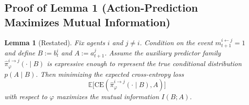 \documentclass{article}
\theoremstyle{plain}
\newtheorem{lemma}[theorem]{Lemma}
\theoremstyle{definition}
\theoremstyle{remark}
\begin{document}
\subsection{Proof of Lemma 1 (Action-Prediction Maximizes Mutual Information)}
\label{app:proof_lemma1}

\begin{lemma}[Restated]
\label{lem:mi_bound}
Fix agents $i$ and $j \neq i$. Condition on the event $m_{t+1}^{i \leftarrow j} = 1$ and define
$B := b_t^i$ and $A := a_{t+1}^j$.
Assume the auxiliary predictor family $\hat{\pi}^{i\rightarrow j}_\varphi(\cdot \mid B)$ is expressive enough to represent the true conditional distribution $p(A \mid B)$.
Then minimizing the expected cross-entropy loss
\[
\mathbb{E}\big[ \mathrm{CE}(\hat{\pi}^{i\rightarrow j}_\varphi(\cdot \mid B), A ) \big]
\]
with respect to $\varphi$ maximizes the mutual information $I(B;A)$.
\end{lemma}
\end{document}
